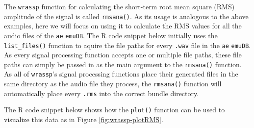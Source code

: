 \documentclass[]{book}
\newenvironment{Shaded}{\begin{snugshade}}{\end{snugshade}}
\newcommand{\CommentTok}[1]{\textcolor[rgb]{0.56,0.35,0.01}{\textit{#1}}}
\newcommand{\DataTypeTok}[1]{\textcolor[rgb]{0.13,0.29,0.53}{#1}}
\newcommand{\DecValTok}[1]{\textcolor[rgb]{0.00,0.00,0.81}{#1}}
\newcommand{\KeywordTok}[1]{\textcolor[rgb]{0.13,0.29,0.53}{\textbf{#1}}}
\newcommand{\NormalTok}[1]{#1}
\newcommand{\OperatorTok}[1]{\textcolor[rgb]{0.81,0.36,0.00}{\textbf{#1}}}
\newcommand{\OtherTok}[1]{\textcolor[rgb]{0.56,0.35,0.01}{#1}}
\newcommand{\StringTok}[1]{\textcolor[rgb]{0.31,0.60,0.02}{#1}}
\begin{document}
The \texttt{wrassp} function for calculating the short-term root mean square (RMS) amplitude of the signal is called \texttt{rmsana()}. As its usage is analogous to the above examples, here we will focus on using it to calculate the RMS values for all the audio files of the \texttt{ae} \texttt{emuDB}. The R code snippet below initially uses the \texttt{list\_files()} function to aquire the file paths for every \texttt{.wav} file in the \texttt{ae} \texttt{emuDB}. As every signal processing function accepts one or multiple file paths, these file paths can simply be passed in as the main argument to the \texttt{rmsana()} function. As all of \texttt{wrassp}'s signal processing functions place their generated files in the same directory as the audio file they process, the \texttt{rmsana()} function will automatically place every \texttt{.rms} into the correct bundle directory.

\begin{Shaded}
\end{Shaded}

The R code snippet below shows how the \texttt{plot()} function can be used to visualize this data as in Figure \ref{fig:wrassp-plotRMS}.
\end{document}
